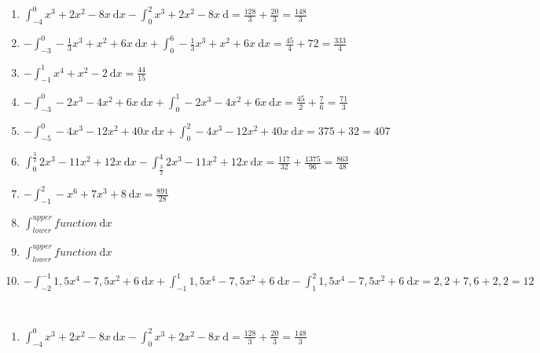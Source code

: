 \documentclass[a4paper,12pt, headsepline, ngerman]{scrartcl}
\theoremstyle{definition}
\newcommand{\td}{\ \text{d}}
\newcommand{\fakesubsection}[1]{%
	\par\refstepcounter{subsection}%
	\subsectionmark{#1}%
	\addcontentsline{toc}{subsection}{\protect\numberline{\thesubsection}#1}%
}
\begin{document}
\begin{Answer}[ref=flaecheRechnA1]\\
	\begin{enumerate}[label=\alph*)]
		\item \(\displaystyle\int_{-4}^{0} x^3+2x^2-8x\td x-\int_{0}^{2} x^3+2x^2-8x\td=\frac{128}{3}+\frac{20}{3}=\frac{148}{3}\)
		\item \(\displaystyle-\int_{-3}^{0} -\frac{1}{3}x^3+x^2+6x\td x+\int_{0}^{6} -\frac{1}{3}x^3+x^2+6x\td x=\frac{45}{4}+72=\frac{333}{4}\)
		\item \(\displaystyle-\int_{-1}^{1} x^4+x^2-2\td x=\frac{44}{15}\)
		\item \(\displaystyle-\int_{-3}^{0} -2x^3-4x^2+6x\td x+\int_{0}^{1} -2x^3-4x^2+6x\td x=\frac{45}{2}+\frac{7}{6}=\frac{71}{3}\)
		\item \(\displaystyle -\int_{-5}^{0}-4x^3-12x^2+40x \td x +\int_{0}^{2}-4x^3-12x^2+40x \td x=375+32=407\)		
		\item \(\displaystyle \int_{0}^{\tfrac{3}{2}} 2x^3-11x^2+12x \td x - \int_{\tfrac{3}{2}}^{4} 2x^3-11x^2+12x \td x=\frac{117}{32}+\frac{1375}{96}=\frac{863}{48}\)
		\item \(\displaystyle -\int_{-1}^{2} -x^6+7x^3+8 \td x=\frac{891}{28}\)
		\item \(\displaystyle \int_{lower}^{upper} function \td x\)
		\item \(\displaystyle \int_{lower}^{upper} function \td x\)		
		\item \(\displaystyle-\int_{-2}^{-1} 1,5x^4-7,5x^2+6\td x+\int_{-1}^{1} 1,5x^4-7,5x^2+6\td x-\int_{1}^{2} 1,5x^4-7,5x^2+6\td x=2,2+7,6+2,2=12\)
	\end{enumerate}
\end{Answer}
\begin{Answer}[ref=flaecheRechnA2]\\
	\begin{enumerate}[label=\alph*)]
		\item \(\displaystyle\int_{-4}^{0} x^3+2x^2-8x\td x-\int_{0}^{2} x^3+2x^2-8x\td=\frac{128}{3}+\frac{20}{3}=\frac{148}{3}\)
	\end{enumerate}
\end{Answer}
\end{document}
